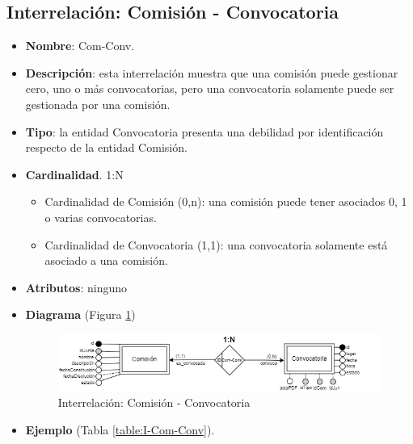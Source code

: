\subsection{Interrelación: Comisión - Convocatoria}
\begin{itemize}
    \item \textbf{Nombre}: Com-Conv.
    \item \textbf{Descripción}: esta interrelación muestra que una comisión puede gestionar cero, uno o más convocatorias, pero una convocatoria solamente puede ser gestionada por una comisión.
    \item \textbf{Tipo}: la entidad Convocatoria presenta una debilidad por identificación respecto de la entidad Comisión.
    \item \textbf{Cardinalidad}. 1:N
    \begin{itemize}
        \item Cardinalidad de Comisión (0,n): una comisión puede tener asociados 0, 1 o varias convocatorias.
        \item Cardinalidad de Convocatoria (1,1): una convocatoria solamente está asociado a una comisión.
    \end{itemize}
    \item \textbf{Atributos}: ninguno
    \item \textbf{Diagrama} (Figura \ref{fig:I-Com-Conv}) 
    \begin{figure}[H]
        \centering
        \includegraphics[scale=0.7]{img/diagramas/EER/I-Com-Conv}
        \caption{Interrelación: Comisión - Convocatoria}
        \label{fig:I-Com-Conv}
    \end{figure}
    
    \item \textbf{Ejemplo} (Tabla \ref{table:I-Com-Conv}).


\end{itemize}
